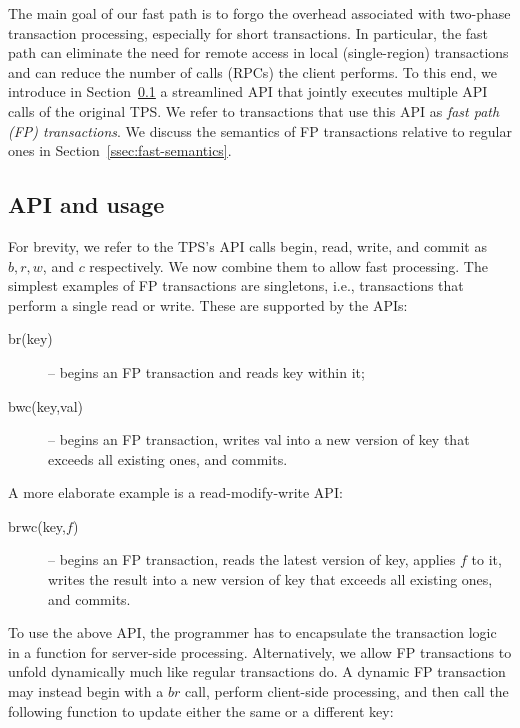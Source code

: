 

The main goal of our fast path  is to forgo the overhead associated with two-phase transaction processing, especially for short transactions.
In particular, the fast path can eliminate the need for remote access in local (single-region) transactions and can reduce the number of 
calls (RPCs) the client performs.
To this end, we introduce in Section~\ref{ssec:fast-api} a streamlined API that jointly executes multiple API calls of the original TPS. 
We refer to transactions that use this API as \emph{fast path (FP) transactions}.
We discuss the semantics of FP transactions relative to regular ones in Section~\ref{ssec:fast-semantics}.

\subsection{API and usage}
\label{ssec:fast-api}

For brevity, we refer to the TPS's API calls  begin, read, write, and commit as $b, r, w$, and $c$ respectively. 
We now combine them to allow fast processing.
The simplest examples of FP transactions are singletons, i.e., transactions that perform a single
read or write. These are supported by the APIs:
\begin{description}
\item[br(key)] -- begins an FP transaction and reads key within it; 
\item[bwc(key,val)] -- begins an FP transaction,  writes val into a new version of key that exceeds all existing ones, and commits.
\end{description}

A more elaborate example is a read-modify-write API: 
\begin{description}
\item[brwc(key,$f$)] -- begins an FP transaction,  reads the latest version of key, applies $f$ to it, 
	writes the result into a new version of key that exceeds all existing ones, and commits.
\end{description}

To use the above API, the programmer has to encapsulate the transaction logic in a function for server-side processing. 
Alternatively, we allow FP transactions to unfold dynamically much like regular  transactions do.
A dynamic FP transaction may instead begin with a $br$ call, perform client-side processing, and then call the following
function to update either the same or a different key: 


